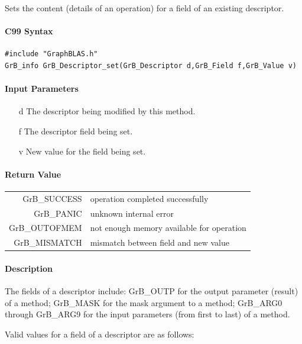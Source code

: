 \documentclass[11pt]{extarticle}
\begin{document}
Sets the content (details of an operation) for a field of an existing
descriptor.

\paragraph{C99 Syntax}

\begin{verbatim}
#include "GraphBLAS.h"
GrB_info GrB_Descriptor_set(GrB_Descriptor d,GrB_Field f,GrB_Value v)
\end{verbatim}

\paragraph{Input Parameters}

\begin{itemize}
	\item[{\sf d}] The descriptor being modified by this method.
	\item[{\sf f}] The descriptor field being set.
	\item[{\sf v}] New value for the field being set.
\end{itemize}

\paragraph{Return Value}

\begin{tabular}{rl} 
{\sf GrB\_SUCCESS} 	& operation completed successfully \\
{\sf GrB\_PANIC}	& unknown internal error \\
{\sf GrB\_OUTOFMEM}	& not enough memory available for operation \\
{\sf GrB\_MISMATCH}	& mismatch between field and new value
\end{tabular}

\paragraph{Description}

The fields of a descriptor include: {\sf GrB\_OUTP} for the 
output parameter (result) of a method; {\sf GrB\_MASK} for the mask
argument to a method; {\sf GrB\_ARG0} through {\sf GrB\_ARG9} for
the input parameters (from first to last) of a method.

Valid values for a field of a descriptor are as follows:
\end{document}
